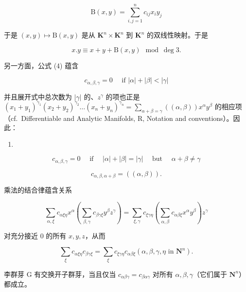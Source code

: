 \[
\mathrm{B} (x, y) = \sum_ {i, j = 1} ^ {n} c _ {i j} x _ {i} y _ {j}
\]

于是 \((x,y)\mapsto \mathrm{B}(x,y)\) 是从 \(\mathbf{K}^n\times \mathbf{K}^n\) 到 \(\mathbf{K}^n\) 的双线性映射。于是

\[
x. y \equiv x + y + \mathrm{B} (x, y) \mod \deg 3.\tag{6}
\]

另一方面，公式 (4) 蕴含

\[
c _ {\alpha , \beta , \gamma} = 0 \quad \text { if } | \alpha | + | \beta | <   | \gamma |\tag{7}
\]

并且展开式中总次数为 \(|\gamma|\) 的、\(z^\gamma\) 的项也正是 \((x_1 + y_1)^{\gamma_1}(x_2 + y_2)^{\gamma_2} \ldots (x_n + y_n)^{\gamma_n} = \sum_{\alpha + \beta = \gamma} ((\alpha, \beta)) x^\alpha y^\beta\) 的相应项（cf.~Differentiable and Analytic Manifolds, R, Notation and conventions）。因此：

\begin{enumerate}
\def\labelenumi{(\arabic{enumi})}
\setcounter{enumi}{7}
\tightlist
\item
\end{enumerate}

\[
c _ {\alpha , \beta , \gamma} = 0 \quad \text { if } \quad | \alpha | + | \beta | = | \gamma | \quad \text { but } \quad \alpha + \beta \neq \gamma\tag{8}
\]

\[
c _ {\alpha , \beta , \alpha + \beta} = ((\alpha , \beta)).\tag{9}
\]

乘法的结合律蕴含关系

\[
\sum_ {\alpha , \xi} c _ {\alpha \xi \eta} x ^ {\alpha} \left(\sum_ {\beta , \gamma} c _ {\beta \gamma \xi} y ^ {\beta} z ^ {\gamma}\right) = \sum_ {\xi , \gamma} c _ {\xi \gamma \eta} \left(\sum_ {\alpha , \beta} c _ {\alpha \beta \xi} x ^ {\alpha} y ^ {\beta}\right) z ^ {\gamma}
\]

对充分接近 0 的所有 \(x, y, z\)，从而

\[
\sum_ {\xi} c _ {\alpha \xi \eta} c _ {\beta \gamma \xi} = \sum_ {\xi} c _ {\xi \gamma \eta} c _ {\alpha \beta \xi} (\alpha , \beta , \gamma , \eta \text { in } \mathbf {N} ^ {n}).\tag{10}
\]

李群芽 G 有交换开子群芽，当且仅当 \(c_{\alpha\beta\gamma} = c_{\beta\alpha\gamma}\) 对所有 \(\alpha, \beta, \gamma\)（它们属于 \(\mathbf{N}^{n}\)）都成立。


